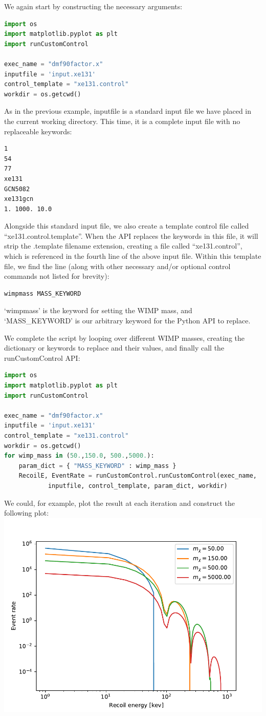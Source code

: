 \documentclass[12pt]{article}
\begin{document}
We again start by constructing the necessary arguments:
\begin{lstlisting}[language=python]
import os
import matplotlib.pyplot as plt
import runCustomControl

exec_name = "dmf90factor.x"
inputfile = 'input.xe131'
control_template = "xe131.control"
workdir = os.getcwd()
\end{lstlisting}
As in the previous example, inputfile is a standard input file we have placed in
the current working directory. This time, it is a complete input file with no
replaceable keywords:
\begin{verbatim}
1
54
77
xe131
GCN5082
xe131gcn
1. 1000. 10.0
\end{verbatim}
Alongside this standard input file, we also create a template control file
called ``xe131.control.template''. When the API replaces the keywords in this
file, it will strip the .template filename extension, creating a file called
``xe131.control'', which is referenced in the fourth line of the above input
file. Within this template file, we find the line (along with other necessary
and/or optional control commands not listed for brevity):
\begin{verbatim}
wimpmass MASS_KEYWORD
\end{verbatim}
`wimpmass' is the keyword for setting the WIMP mass, and `MASS\_KEYWORD' is our
arbitrary keyword for the Python API to replace.

We complete the script by looping over different WIMP masses, creating the
dictionary or keywords to replace and their values, and finally call the
runCustomControl API:
\begin{lstlisting}[language=python]
import os
import matplotlib.pyplot as plt
import runCustomControl

exec_name = "dmf90factor.x"
inputfile = 'input.xe131'
control_template = "xe131.control"
workdir = os.getcwd()
for wimp_mass in (50.,150.0, 500.,5000.):
    param_dict = { "MASS_KEYWORD" : wimp_mass }
    RecoilE, EventRate = runCustomControl.runCustomControl(exec_name,
            inputfile, control_template, param_dict, workdir)
\end{lstlisting}
We could, for example, plot the result at each iteration and construct the
following plot:
\includegraphics[width=\textwidth]{xe131.WIMPmassCompare.pdf}
\end{document}
